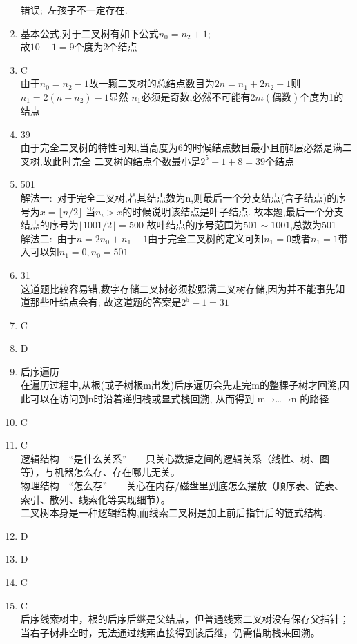 \documentclass[12pt, a4paper, oneside, UTF8]{ctexbook}
\begin{document}
\begin{enumerate}
    错误;\ 左孩子不一定存在. 
    \item 
    基本公式,对于二叉树有如下公式$n_0=n_2+1$;\\
    故$10-1=9$个度为2个结点 
    \item C \\
    由于$n_0=n_2-1$故一颗二叉树的总结点数目为$2n=n_1+2n_2+1$则$n_1=2(n-n_2)-1$显然
    $n_1$必须是奇数,必然不可能有$2m(\text{偶数})$个度为1的结点 
    \item 39 \\
    由于完全二叉树的特性可知,当高度为6的时候结点数目最小且前5层必然是满二叉树,故此时完全
    二叉树的结点个数最小是$2^5-1+8=39$个结点 
    \item 501 \\
    解法一:\ 对于完全二叉树,若其结点数为n,则最后一个分支结点(含子结点)的序号为$x=\lfloor n/2 \rfloor$
    当$n_i>x$的时候说明该结点是叶子结点. 故本题,最后一个分支结点的序号为$\lfloor 1001/2 \rfloor=500$
    故叶结点的序号范围为$501\sim 1001$,总数为501 \\
    解法二:\ 由于$n=2n_0+n_1-1$由于完全二叉树的定义可知$n_1=0$或者$n_1=1$带入可以知$n_1=0,n_0=501$
    \item 31 \\
    这道题比较容易错,数字存储二叉树必须按照满二叉树存储,因为并不能事先知道那些叶结点会有; 
    故这道题的答案是$2^5-1=31$
    \item C 
    \item D
    \item 后序遍历 \\
    在遍历过程中,从根(或子树根m出发)后序遍历会先走完m的整棵子树才回溯,因此可以在访问到n时沿着递归栈或显式栈回溯,
    从而得到 m→…→n 的路径
    \item C 
    \item C \\
    逻辑结构＝“是什么关系”——只关心数据之间的逻辑关系（线性、树、图等），与机器怎么存、存在哪儿无关。 \\
    物理结构＝“怎么存”——关心在内存/磁盘里到底怎么摆放（顺序表、链表、索引、散列、线索化等实现细节）。 \\
    二叉树本身是一种逻辑结构,而线索二叉树是加上前后指针后的链式结构. 
    \item D 
    \item D
    \item C
    \item C \\
    后序线索树中，根的后序后继是父结点，但普通线索二叉树没有保存父指针；
    当右子树非空时，无法通过线索直接得到该后继，仍需借助栈来回溯。

\end{enumerate}
\end{document}
